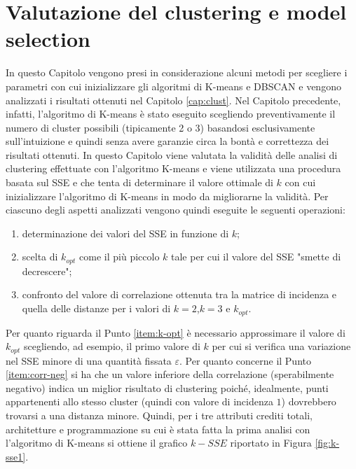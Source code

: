 \documentclass[12pt]{article}
\begin{document}
\section{Valutazione del clustering e model selection}
\label{cap:val-clust}
In questo Capitolo vengono presi in considerazione alcuni metodi per scegliere i parametri con cui inizializzare gli algoritmi di K-means e DBSCAN e vengono analizzati i risultati ottenuti nel Capitolo \ref{cap:clust}.
Nel Capitolo preceden\-te, infatti, l'algoritmo di K-means è stato eseguito scegliendo preventiva\-mente il numero di cluster possibili (tipicamente 2 o 3) basandosi esclusiva\-mente sull'intuizione e quindi senza avere garanzie circa la bontà e corret\-tezza dei risultati ottenuti. In questo Capitolo viene valutata la validità delle analisi di clustering effettuate con l'algoritmo K-means e viene utilizzata una procedura basata sul SSE e che tenta di determinare il valore ottimale di $k$ con cui inizializzare l'algoritmo di K-means in modo da migliorarne la validità. Per ciascuno degli aspetti analizzati vengono quindi eseguite le seguenti operazioni:

\begin{enumerate}
\item determinazione dei valori del SSE in funzione di $k$;
\item \label{item:k-opt} scelta di $k_{opt}$ come il più piccolo $k$ tale per cui il valore del SSE "smette di decrescere";
\item \label{item:corr-neg} confronto del valore di correlazione ottenuta tra la matrice di incidenza e quella delle distanze per i valori di $k=2$,$k=3$ e $k_{opt}$.
\end{enumerate}

Per quanto riguarda il Punto \ref{item:k-opt} è necessario approssimare il valore di $k_{opt}$ scegliendo, ad esempio, il primo valore di $k$ per cui si verifica una variazione nel SSE minore di una quantità fissata $\varepsilon$. Per quanto concerne il Punto \ref{item:corr-neg} si ha che un valore inferiore della correlazione (sperabilmente negativo) indica un miglior risultato di clustering poiché, idealmente, punti appartenenti allo stesso cluster (quindi con valore di incidenza $1$) dovrebbero trovarsi a una distanza minore. Quindi, per i tre attributi crediti totali, architetture e programmazione su cui è stata fatta la prima analisi con l'algoritmo di K-means si ottiene il grafico $k-SSE$ riportato in Figura \ref{fig:k-sse1}.
\end{document}
